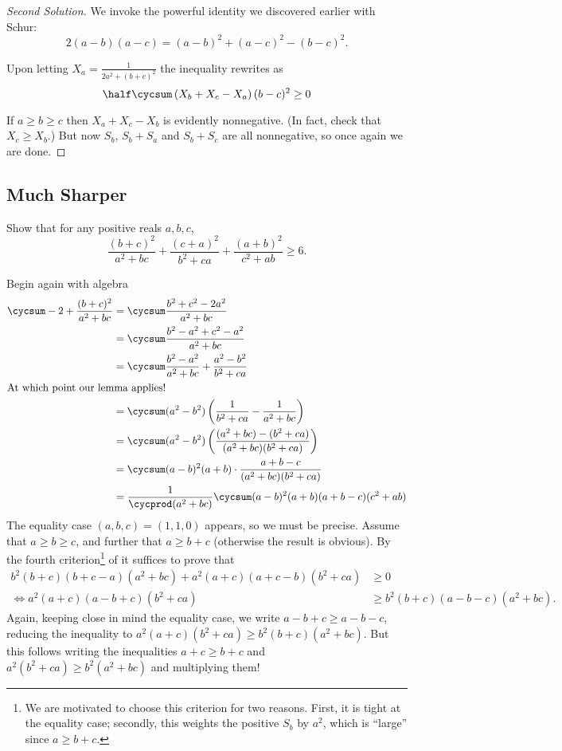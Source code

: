 \documentclass{scrartcl}
\begin{document}
\begin{proof}[Second Solution]
  We invoke the powerful identity we discovered earlier with Schur:
  \[ 2(a-b)(a-c) = (a-b)^2 + (a-c)^2 - (b-c)^2. \]

  Upon letting $X_a = \frac{1}{2a^2+(b+c)^2}$ the inequality rewrites as
  \[ \half \cycsum \left( X_b+X_c-X_a \right)(b-c)^2 \ge 0 \]

  If $a \ge b \ge c$ then $X_a + X_c - X_b$ is evidently nonnegative.
  (In fact, check that $X_c \ge X_b$.)
  But now $S_b$, $S_b+S_a$ and $S_b+S_c$ are all nonnegative, so once again we are done.
\end{proof}

\subsection{Much Sharper}
\begin{example}
  Show that for any positive reals $a,b,c$,
  \[ \frac{(b+c)^2}{a^2+bc} + \frac{(c+a)^2}{b^2+ca} + \frac{(a+b)^2}{c^2+ab} \ge 6. \]
\end{example}
\begin{soln}
  Begin again with algebra
  \begin{align*}
    \cycsum -2 + \frac{(b+c)^2}{a^2+bc} &= \cycsum \frac{b^2+c^2-2a^2}{a^2+bc} \\
    &= \cycsum \frac{b^2-a^2 + c^2-a^2}{a^2+bc} \\
    &= \cycsum \frac{b^2-a^2}{a^2+bc} + \frac{a^2-b^2}{b^2+ca} \\
    \intertext{At which point our lemma applies!}
    &= \cycsum (a^2-b^2) \left( \frac{1}{b^2+ca} - \frac{1}{a^2+bc} \right) \\
    &= \cycsum (a^2-b^2) \left( \frac{(a^2+bc)-(b^2+ca)}{(a^2+bc)(b^2+ca)} \right) \\
    &= \cycsum (a-b)^2(a+b) \cdot \frac{a+b-c}{(a^2+bc)(b^2+ca)}  \\
    &= \frac{1}{\cycprod (a^2+bc)} \cycsum (a-b)^2(a+b)(a+b-c)(c^2+ab)
  \end{align*}
  The equality case $(a,b,c) = (1,1,0)$ appears, so we must be precise.
  Assume that $a \ge b \ge c$, and further that $a \ge b+c$ (otherwise the result is obvious).
  By the fourth criterion\footnote{We are motivated to choose this criterion for two reasons.
    First, it is tight at the equality case; secondly,
    this weights the positive $S_b$ by $a^2$, which is ``large'' since $a \ge b+c$.}
  of  it suffices to prove that
  \begin{align*}
    b^2(b+c)(b+c-a)(a^2+bc) + a^2(a+c)(a+c-b)(b^2+ca) &\ge 0 \\
    \iff a^2(a+c)(a-b+c)(b^2+ca) &\ge b^2(b+c)(a-b-c)(a^2+bc).
  \end{align*}
  Again, keeping close in mind the equality case, we write $a-b+c \ge a-b-c$,
  reducing the inequality to $a^2(a+c)(b^2+ca) \ge b^2(b+c)(a^2+bc)$.
  But this follows writing the inequalities $a+c \ge b+c$
  and $a^2(b^2+ca) \ge b^2(a^2+bc)$ and multiplying them!
\end{soln}
\end{document}
